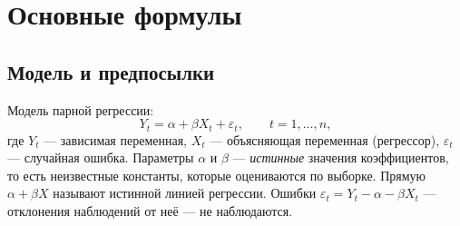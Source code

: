 %
%
%


\ifsolutions
\section{Основные формулы}

\subsection{Модель и предпосылки}\label{sec:model}

Модель парной регрессии:
\begin{equation}
  Y_t = \alpha + \beta X_t + \varepsilon_t, \qquad t = 1,\dots,n,
  \label{eq:model}
\end{equation}
где $Y_t$ — зависимая переменная, $X_t$ — объясняющая переменная (регрессор),
$\varepsilon_t$ — случайная ошибка. Параметры $\alpha$ и $\beta$ —
\emph{истинные} значения коэффициентов, то есть неизвестные константы, которые
оцениваются по выборке. Прямую $\alpha + \beta X$ называют истинной линией
регрессии. Ошибки $\varepsilon_t = Y_t - \alpha - \beta X_t$ — отклонения
наблюдений от неё — не наблюдаются.

